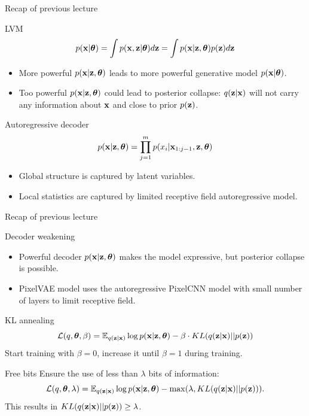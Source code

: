 \begin{frame}{Recap of previous lecture}
	\begin{block}{LVM}
		\vspace{-0.3cm}
		\[
		    p(\mathbf{x} | \boldsymbol{\theta}) = \int p(\mathbf{x}, \mathbf{z} | \boldsymbol{\theta}) d \mathbf{z} = \int p(\mathbf{x} | \mathbf{z}, \boldsymbol{\theta}) p(\mathbf{z}) d \mathbf{z} 
		\]
		\vspace{-0.3cm}
	\end{block}
	\begin{itemize}
		\item More powerful $p(\mathbf{x} | \mathbf{z}, \boldsymbol{\theta})$ leads to more powerful generative model $p(\mathbf{x} | \boldsymbol{\theta})$.
		\item Too powerful $p(\mathbf{x} | \mathbf{z}, \boldsymbol{\theta})$ could lead to posterior collapse: $q(\mathbf{z} | \mathbf{x})$ will not carry any information about $\mathbf{x}$ and close to prior $p(\mathbf{z})$.
	\end{itemize}
	\begin{block}{Autoregressive decoder}
		\vspace{-0.2cm}
		\[
		    p(\mathbf{x} | \mathbf{z} , \boldsymbol{\theta}) = \prod_{j=1}^m p(x_i | \mathbf{x}_{1:j - 1}, \mathbf{z} , \boldsymbol{\theta})
		\]
	\end{block}
	\begin{itemize}
		\item Global structure is captured by latent variables.
		\item Local statistics are captured by limited receptive field autoregressive model.
	\end{itemize}
	
\end{frame}
\begin{frame}{Recap of previous lecture}
	\begin{block}{Decoder weakening}
		\begin{itemize}
			\item Powerful decoder $p(\mathbf{x} | \mathbf{z}, \boldsymbol{\theta})$ makes the model expressive, but posterior collapse is possible.
			\item PixelVAE model uses the autoregressive PixelCNN model with small number of layers to limit receptive field.
		\end{itemize}
	\end{block}
	
	\begin{block}{KL annealing}
		\vspace{-0.2cm}
		\[
		    \mathcal{L}(q, \boldsymbol{\theta}, \beta) = \mathbb{E}_{q(\mathbf{z} | \mathbf{x})} \log p(\mathbf{x} | \mathbf{z}, \boldsymbol{\theta}) - \beta \cdot KL (q(\mathbf{z} | \mathbf{x}) || p(\mathbf{z}))
		\]
		Start training with $\beta = 0$, increase it until $\beta = 1$ during training.
	\end{block}
	
	\begin{block}{Free bits}
		Ensure the use of less than $\lambda$ bits of information:
		\[
		    \mathcal{L}(q, \boldsymbol{\theta}, \lambda) = \mathbb{E}_{q(\mathbf{z} | \mathbf{x})} \log p(\mathbf{x} | \mathbf{z}, \boldsymbol{\theta}) - \max(\lambda, KL (q(\mathbf{z} | \mathbf{x}) || p(\mathbf{z}))).
		\]
		This results in $KL (q(\mathbf{z} | \mathbf{x}) || p(\mathbf{z})) \geq \lambda$.
	\end{block}
\end{frame}
